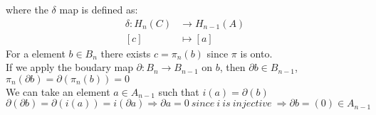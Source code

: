 \documentclass[11pt,a4paper]{report}
\begin{document}
% 
                where the $\delta$ map is defined as:
                \begin{align*}
                  \delta: H_n(C) &\rightarrow H_{n-1}(A)\\
                  [c] &\mapsto [a]
                \end{align*}
                For a element $b \in B_n$ there exists $c = \pi_n(b)$ since $\pi$ is onto. \\
                If we apply the boudary map $\partial: B_{n} \rightarrow B_{n-1}$ on $b$, then
                $\partial b \in B_{n-1}$,  $\pi_n(\partial b) = \partial(\pi_n(b)) = 0$\\
                We can take an element $a \in A_{n-1}$ such that $i(a) = \partial(b)$\\
                $
                  \partial (\partial b) = \partial (i(a)) = i(\partial a) \Rightarrow \partial a = 0\ since\ i\ is\ injective \ \Rightarrow \partial b = (0) \in A_{n-1}
                $
\end{document}
